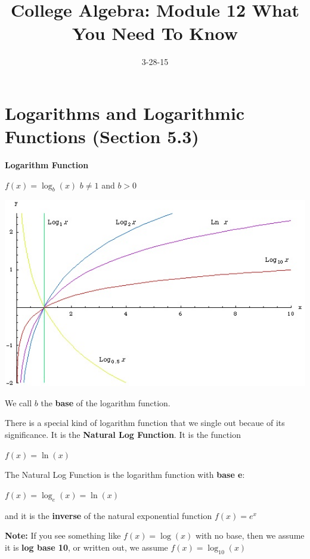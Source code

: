 \documentclass[12pt]{article}
\begin{document}
\title{College Algebra: Module 12 What You Need To Know}
\date{3-28-15}
\author{}
\maketitle

\section{Logarithms and Logarithmic Functions (Section 5.3)}

\textbf{Logarithm Function}
\newline

\centerline{$f(x) = \log_{b}(x)$ \hspace{2cm} $b \neq 1$ and $b > 0$} 

\vspace{.5cm}

\centerline{\includegraphics{LogGraph.jpg}}

We call $b$ the \textbf{base} of the logarithm function. 

There is a special kind of logarithm function that we single out becaue of its significance. It is the \textbf{Natural Log Function}. It is the function
\newline

\centerline{$f(x) = \ln(x)$}

The Natural Log Function is the logarithm function with \textbf{base e}:
\newline

\centerline{$f(x) = \log_{e}(x) = \ln(x)$}

and it is the \textbf{inverse} of the natural exponential function $f(x) = e^{x}$

\textbf{Note:} If you see something like $f(x) = \log(x)$ with no base, then we assume it is \textbf{log base 10}, or written out, we assume $f(x) = \log_{10}(x)$
\end{document}
